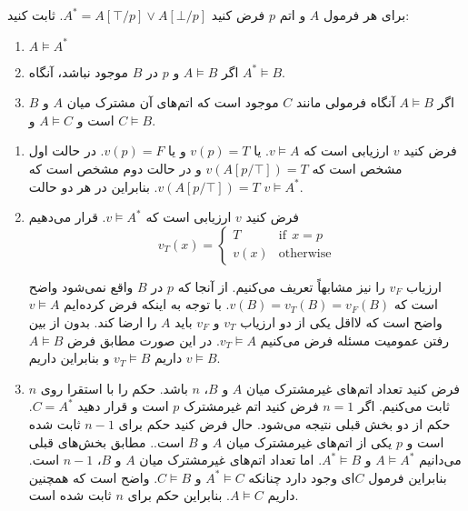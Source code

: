 برای هر فرمول $A$ و اتم $p$ فرض کنید
$A^*=A[\top/p]\vee A[\bot/p]$.
ثابت کنید:
\begin{enumerate}
\item
$A\models A^*$
\item
اگر
$A\models B$
و $p$ در $B$ موجود نباشد، آنگاه
$A^*\models B$.
\item
اگر
$A\models B$
آنگاه فرمولی مانند $C$ موجود است که اتم‌های آن مشترک میان $A$ و $B$ است و $A\models C$ و $C\models B$.
\end{enumerate}\quad
\begin{ans}
  \begin{enumerate}
  \item
  فرض کنید $v$ ارزیابی است که $v\models A$. یا $v(p)=T$ و یا $v(p)=F$. در حالت اول مشخص است که
  $v(A[p/\top])=T$
  و در حالت دوم مشخص است که
  $v(A[p/\top])=T$.
  بنابراین در هر دو حالت
  $v\models A^*$.

  \item
  فرض کنید $v$ ارزیابی است که $v\models A^*$. قرار می‌دهیم
  $$
  v_T(x)=
  \begin{cases}
  T & \text{if}~~x=p\\
  v(x) & \text{otherwise}
  \end{cases}
  $$

  ارزیاب $v_F$ را نیز مشابهاً تعریف می‌کنیم. از آنجا که $p$ در $B$ واقع نمی‌شود واضح است که $v(B)=v_T(B)=v_F(B)$. با توجه به اینکه فرض کرده‌ایم $v\models A$ واضح است که لااقل یکی از دو ارزیاب $v_T$ و $v_F$ باید $A$ را ارضا کند. بدون از بین رفتن عمومیت مسئله فرض می‌کنیم $v_T\models A$. در این صورت مطابق فرض $A\models B$ داریم $v_T\models B$ و بنابراین داریم $v\models B$.

  \item
  فرض کنید تعداد اتم‌های غیرمشترک میان $A$ و $B$، $n$ باشد. حکم را با استقرا روی $n$ ثابت می‌کنیم. اگر $n=1$ فرض کنید اتم غیرمشترک $p$ است و قرار دهید $C=A^*$. حکم از دو بخش قبلی نتیجه می‌شود. حال فرض کنید حکم برای $n-1$ ثابت شده است و $p$ یکی از اتم‌های غیرمشترک میان $A$ و $B$ است.. مطابق بخش‌های قبلی می‌دانیم $A\models A^*$ و $A^*\models B$. اما تعداد اتم‌های غیرمشترک میان $A$ و $B$، $n-1$ است. بنابراین فرمول $C$ای وجود دارد چنانکه $A^*\models C$ و $C\models B$. واضح است که همچنین داریم $A\models C$. بنابراین حکم برای $n$ ثابت شده است.
  \end{enumerate}
\end{ans}